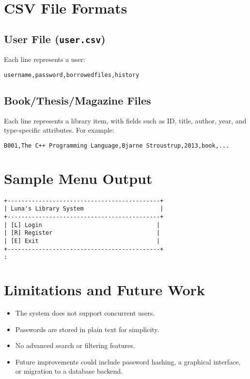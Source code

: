\documentclass[a4paper,12pt]{article}
\begin{document}
\section{CSV File Formats}
\subsection{User File (\texttt{user.csv})}
Each line represents a user:
\begin{verbatim}
username,password,borrowedfiles,history
\end{verbatim}

\subsection{Book/Thesis/Magazine Files}
Each line represents a library item, with fields such as ID, title, author, year, and type-specific attributes. For example:
\begin{verbatim}
B001,The C++ Programming Language,Bjarne Stroustrup,2013,book,...
\end{verbatim}

\section{Sample Menu Output}
\begin{verbatim}
+--------------------------------------------+
| Luna's Library System                      |
+--------------------------------------------+
| [L] Login                                 |
| [R] Register                              |
| [E] Exit                                  |
+--------------------------------------------+
: 
\end{verbatim}

\section{Limitations and Future Work}
\begin{itemize}
    \item The system does not support concurrent users.
    \item Passwords are stored in plain text for simplicity.
    \item No advanced search or filtering features.
    \item Future improvements could include password hashing, a graphical interface, or migration to a database backend.
\end{itemize}
\end{document}
